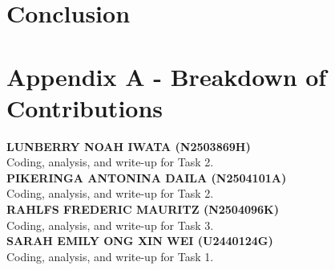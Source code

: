 \documentclass[12pt]{article}
\begin{document}
\pagebreak
\section{Conclusion} %

\pagebreak
\section*{Appendix A - Breakdown of Contributions}
\renewcommand{\thepage}{A-\arabic{page}}

\textbf{LUNBERRY NOAH IWATA (N2503869H)} \\
Coding, analysis, and write-up for Task 2. \\

\textbf{PIKERINGA ANTONINA DAILA (N2504101A)} \\
Coding, analysis, and write-up for Task 2. \\

\textbf{RAHLFS FREDERIC MAURITZ (N2504096K)} \\
Coding, analysis, and write-up for Task 3. \\

\textbf{SARAH EMILY ONG XIN WEI (U2440124G)} \\
Coding, analysis, and write-up for Task 1. \\
\end{document}

